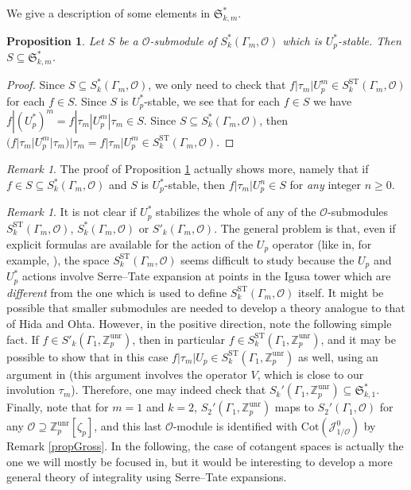 \documentclass[a4paper,11pt]{amsart}
\numberwithin{equation}{section}
\theoremstyle{plain}
\newtheorem{proposition}[theorem]{Proposition}
\theoremstyle{definition}
\theoremstyle{remark}
\newtheorem{remark}[theorem]{Remark}
\newcommand{\Z}{\mathbb{Z}}
\newcommand{\unr}{\mathrm{unr}}
\newcommand{\ST}{\mathrm{ST}}
\newcommand{\Cot}{\mathrm{Cot}}
\begin{document}
{
We give a description of some elements in $\mathfrak{S}_{k,m}^*$. 

\begin{proposition}\label{propinteg}
Let $S$ be a $\mathcal{O}$-submodule of $S^*_k(\Gamma_m,\mathcal{O})$ which is $U_p^*$-stable. Then 
$S\subseteq\mathfrak{S}_{k,m}^*$. 
\end{proposition}

\begin{proof} Since $S\subseteq S_k^*(\Gamma_m,\mathcal{O})$, we only need to check that $f|\tau_m|U_p^m\in S_k^\ST(\Gamma_m,\mathcal{O})$ for each $f\in S$. 
Since $S$ is $U_p^*$-stable, we see that for each $f\in S$ we have $f|(U_p^*)^m=f|\tau_m|U_p^m|\tau_m\in S$. Since $S\subseteq S_k^*(\Gamma_m,\mathcal{O})$, then $(f|\tau_m|U_p^m|\tau_m)|\tau_m=f|\tau_m|U_p^m\in S_k^\ST(\Gamma_m,\mathcal{O})$. 
\end{proof}

\begin{remark}
The proof of Proposition \ref{propinteg} actually shows more, namely that if $f\in S\subseteq S^*_k(\Gamma_m,\mathcal{O})$ and $S$ is $U_p^*$-stable, then $f|\tau_m|U_p^n\in S$ for \emph{any} integer $n\geq 0$. 
\end{remark}


\begin{remark}\label{remohta}
It is not clear if $U_p^*$ stabilizes the whole of any of the $\mathcal{O}$-submodules $S_k^\ST(\Gamma_m,\mathcal{O})$, $S^*_k(\Gamma_m,\mathcal{O})$ or $S'_k(\Gamma_m,\mathcal{O})$. The general problem is that, even if explicit formulas are available for the action of the $U_p$ operator (like in, for example, \cite[\S4.4]{Brooks}), the space $S_k^\ST(\Gamma_m,\mathcal{O})$ seems difficult to study because the $U_p$ and $U_p^*$ actions involve Serre--Tate expansion at points in the Igusa tower which are \emph{different} from the one which is used to {define}  $S_k^\ST(\Gamma_m,\mathcal{O})$  itself. It might be possible that smaller submodules are needed to develop a theory analogue to that of Hida and Ohta. 
However, in the positive direction, note the following simple fact. 
    If $f\in S'_k(\Gamma_1,\Z_p^\unr)$, then in particular $f\in S_k^\ST(\Gamma_1,\Z_p^\unr)$, and it may be possible to show 
    that in this case $f|\tau_m|U_p\in S_k^\ST(\Gamma_1,\Z_p^\unr)$ as well, using an argument in 
    \cite[Proposition 4.17]{Brooks} (this argument involves the operator $V$, which is close to our involution $\tau_m$). 
    Therefore, one may indeed check that $S_k'(\Gamma_1,\Z_p^\unr)\subseteq \mathfrak{S}_{k,1}^*$. Finally, note that for $m=1$ and $k=2$,  
    $S_2'(\Gamma_1,\Z_p^\unr)$ maps to $S_2'(\Gamma_1,\mathcal{O})$ for any $\mathcal{O}\supseteq\Z_p^\unr[\zeta_p]$, 
    and this last $\mathcal{O}$-module is identified with $\Cot(\mathcal{J}^0_{1/\mathcal{O}})$ by Remark \ref{propGross}. In the following, the case of 
    cotangent spaces is actually the one we will mostly be focused in, but it would be interesting to develop a more general theory of integrality using Serre--Tate expansions.   
\end{remark}
}
\end{document}
